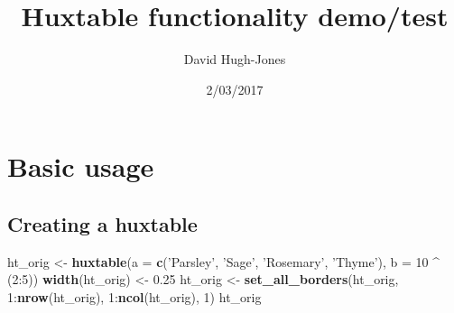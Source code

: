 \documentclass[]{article}
\title{Huxtable functionality demo/test}
\author{David Hugh-Jones}
\date{2/03/2017}
\newenvironment{Shaded}{\begin{snugshade}}{\end{snugshade}}
\newcommand{\KeywordTok}[1]{\textcolor[rgb]{0.13,0.29,0.53}{\textbf{{#1}}}}
\newcommand{\DataTypeTok}[1]{\textcolor[rgb]{0.13,0.29,0.53}{{#1}}}
\newcommand{\DecValTok}[1]{\textcolor[rgb]{0.00,0.00,0.81}{{#1}}}
\newcommand{\FloatTok}[1]{\textcolor[rgb]{0.00,0.00,0.81}{{#1}}}
\newcommand{\StringTok}[1]{\textcolor[rgb]{0.31,0.60,0.02}{{#1}}}
\newcommand{\NormalTok}[1]{{#1}}
\begin{document}
\maketitle

\section{Basic usage}\label{basic-usage}

\subsection{Creating a huxtable}\label{creating-a-huxtable}

\begin{Shaded}
\begin{Highlighting}[]
\NormalTok{ht_orig <-}\StringTok{ }\KeywordTok{huxtable}\NormalTok{(}\DataTypeTok{a =} \KeywordTok{c}\NormalTok{(}\StringTok{'Parsley'}\NormalTok{, }\StringTok{'Sage'}\NormalTok{, }\StringTok{'Rosemary'}\NormalTok{, }\StringTok{'Thyme'}\NormalTok{), }\DataTypeTok{b =} \DecValTok{10} \NormalTok{^}\StringTok{ }\NormalTok{(}\DecValTok{2}\NormalTok{:}\DecValTok{5}\NormalTok{)) }
\KeywordTok{width}\NormalTok{(ht_orig) <-}\StringTok{ }\FloatTok{0.25}
\NormalTok{ht_orig <-}\StringTok{ }\KeywordTok{set_all_borders}\NormalTok{(ht_orig, }\DecValTok{1}\NormalTok{:}\KeywordTok{nrow}\NormalTok{(ht_orig), }\DecValTok{1}\NormalTok{:}\KeywordTok{ncol}\NormalTok{(ht_orig), }\DecValTok{1}\NormalTok{)}
\NormalTok{ht_orig}
\end{Highlighting}
\end{Shaded}
\end{document}
